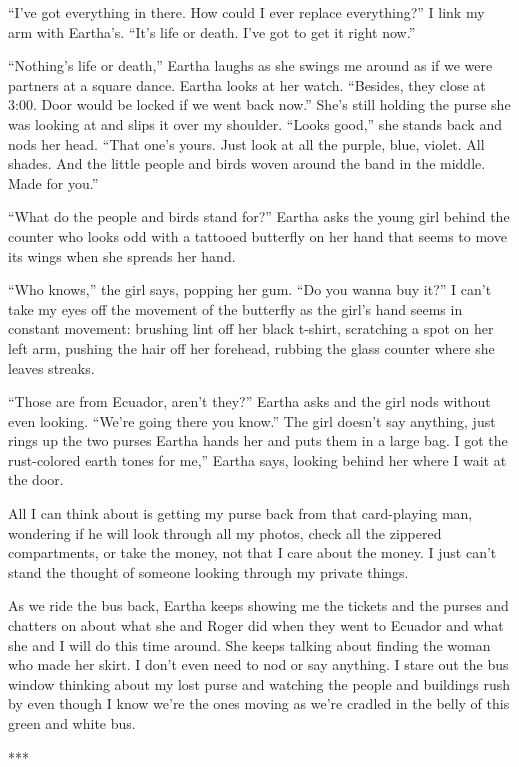 \documentclass[
]{article}
\begin{document}
``I've got everything in there. How could I ever replace everything?'' I
link my arm with Eartha's. ``It's life or death. I've got to get it
right now.''

``Nothing's life or death,'' Eartha laughs as she swings me around as if
we were partners at a square dance. Eartha looks at her watch.
``Besides, they close at 3:00. Door would be locked if we went back
now.'' She's still holding the purse she was looking at and slips it
over my shoulder. ``Looks good,'' she stands back and nods her head.
``That one's yours. Just look at all the purple, blue, violet. All
shades. And the little people and birds woven around the band in the
middle. Made for you.''

``What do the people and birds stand for?'' Eartha asks the young girl
behind the counter who looks odd with a tattooed butterfly on her hand
that seems to move its wings when she spreads her hand.

``Who knows,'' the girl says, popping her gum. ``Do you wanna buy it?''
I can't take my eyes off the movement of the butterfly as the girl's
hand seems in constant movement: brushing lint off her black t-shirt,
scratching a spot on her left arm, pushing the hair off her forehead,
rubbing the glass counter where she leaves streaks.

``Those are from Ecuador, aren't they?'' Eartha asks and the girl nods
without even looking. ``We're going there you know.'' The girl doesn't
say anything, just rings up the two purses Eartha hands her and puts
them in a large bag. I got the rust-colored earth tones for me,'' Eartha
says, looking behind her where I wait at the door.

All I can think about is getting my purse back from that card-playing
man, wondering if he will look through all my photos, check all the
zippered compartments, or take the money, not that I care about the
money. I just can't stand the thought of someone looking through my
private things.

As we ride the bus back, Eartha keeps showing me the tickets and the
purses and chatters on about what she and Roger did when they went to
Ecuador and what she and I will do this time around. She keeps talking
about finding the woman who made her skirt. I don't even need to nod or
say anything. I stare out the bus window thinking about my lost purse
and watching the people and build­ings rush by even though I know we're
the ones moving as we're cradled in the belly of this green and white
bus.

***
\end{document}
